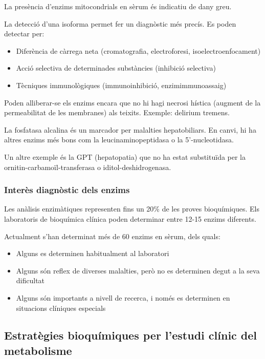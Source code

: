 La presència d'enzims mitocondrials en sèrum és indicatiu de dany greu.

La detecció d'una isoforma permet fer un diagnòstic més precís. Es
poden detectar per:
\begin{itemize}
\item Diferència de càrrega neta (cromatografia, electroforesi,
  isoelectroenfocament)
\item Acció selectiva de determinades substàncies (inhibició
  selectiva)
\item Tècniques immunològiques (immunoinhibició, enzimimmunoassaig)
\end{itemize}

Poden alliberar-se els enzims encara que no hi hagi necrosi hística
(augment de la permeabilitat de les membranes) als teixits. Exemple:
delirium tremens.

La fosfatasa alcalina és un marcador per malalties hepatobiliars. En
canvi, hi ha altres enzims més bons com la leucinaminopeptidasa o la
5'-nucleotidasa.

Un altre exemple és la GPT (hepatopatia) que no ha estat substituïda
per la ornitin-carbamoïl-transferasa o iditol-deshidrogenasa.

\subsubsection{Interès diagnòstic dels enzims}
Les anàlisis enzimàtiques representen fins un 20\% de les proves
bioquímiques. Els laboratoris de bioquímica clínica poden determinar
entre 12-15 enzims diferents.

Actualment s'han determinat més de 60 enzims en sèrum, dels quals:
\begin{itemize}
\item Alguns es determinen habitualment al laboratori
\item Alguns són reflex de diverses malalties, però no es determinen
  degut a la seva dificultat
\item Alguns són importants a nivell de recerca, i només es determinen
  en situacions clíniques especials
\end{itemize}


\subsection{Estratègies bioquímiques per l'estudi clínic del
  metabolisme}

